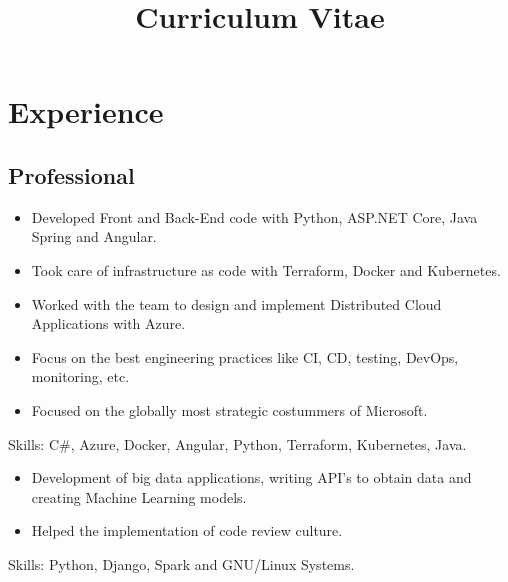 \documentclass[10pt, a4paper, roman]{moderncv} %
\title{Curriculum Vitae}
\begin{document}
\makecvtitle %

\section{Experience}
\subsection{Professional}

{
}


{
    \begin{itemize}
        \item Developed Front and Back-End code with Python, ASP.NET Core, Java Spring and Angular.
	    \item Took care of infrastructure as code with Terraform, Docker and Kubernetes.
	    \item Worked with the team to design and implement Distributed Cloud Applications with Azure.
	    \item Focus on the best engineering practices like CI, CD, testing, DevOps, monitoring, etc.
        \item Focused on the globally most strategic costummers of Microsoft.
    \end{itemize}
Skills: C\#, Azure, Docker, Angular, Python, Terraform, Kubernetes, Java.
}

{
    \begin{itemize}
        \item Development of big data applications, writing API's to obtain data and creating Machine Learning models. 
        \item Helped the implementation of code review culture.
    \end{itemize}
    Skills: Python, Django, Spark and GNU/Linux Systems.
}
\end{document}
